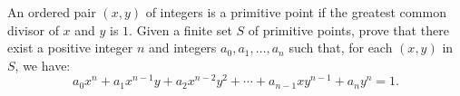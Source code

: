 An ordered pair $(x, y)$ of integers is a primitive point if the greatest common divisor of $x$ and $y$ is $1$. Given a finite set $S$ of primitive points, prove that there exist a positive integer $n$ and integers $a_0, a_1, \ldots , a_n$ such that, for each $(x, y)$ in $S$, we have:$$a_0x^n + a_1x^{n-1} y + a_2x^{n-2}y^2 + \cdots + a_{n-1}xy^{n-1} + a_ny^n = 1.$$
